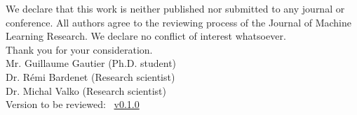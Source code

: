 \documentclass[twoside,11pt]{article}
\begin{document}
We declare that this work is neither published nor submitted to any journal or conference.
All authors agree to the reviewing process of the Journal of Machine Learning Research.
We declare no conflict of interest whatsoever.\\

Thank you for your consideration.\\

Mr. Guillaume Gautier (Ph.D. student)\\
\indent Dr. Rémi Bardenet (Research scientist)\\
\indent Dr. Michal Valko (Research scientist)\\

Version to be reviewed: \DPPy\ \href{https://github.com/guilgautier/DPPy}{v0.1.0}
\\
\end{document}
